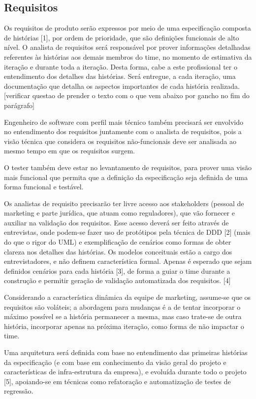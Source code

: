 \documentclass[12pt,journal,compsoc]{IEEEtran}
\begin{document}
\subsection{Requisitos}

Os requisitos de produto serão expressos por meio de uma especificação composta de histórias [1], por ordem de prioridade, que são definições funcionais de alto nível. O analista de requisitos será responsável por prover informações detalhadas referentes às histórias aos demais membros do time, no momento de estimativa da iteração e durante toda a iteração. Desta forma, cabe a este profissional ter o entendimento dos detalhes das histórias. Será entregue, a cada iteração, uma documentação que detalha os aspectos importantes de cada história realizada. [verificar questao de prender o texto com o que vem abaixo por gancho no fim do parágrafo]

Engenheiro de software com perfil mais técnico também precisará ser envolvido no entendimento dos requisitos juntamente com o analista de requisitos, pois a visão técnica que considera os requisitos não-funcionais deve ser analisada ao mesmo tempo em que os requisitos surgem.

O tester também deve estar no levantamento de requisitos, para prover uma visão mais funcional que permita que a definição da especificação seja definida de uma forma funcional e testável.

Os analistas de requisito precisarão ter livre acesso aos stakeholders (pessoal de marketing e parte jurídica, que atuam como reguladores), que vão fornecer e auxiliar na validação dos requisitos. Esse acesso deverá ser feito através de entrevistas, onde podem-se fazer uso de protótipos pela técnica de DDD [2] (mais do que o rigor do UML) e exemplificação de cenários como formas de obter clareza nos detalhes das histórias. Os modelos conceituais estão a cargo dos entrevistadores, e não definem característica formal. Apenas é esperado que sejam definidos cenários para cada história [3], de forma a guiar o time durante a construção e permitir geração de validação automatizada dos requisitos. [4]

Considerando a característica dinâmica da equipe de marketing, assume-se que os requisitos são voláteis; a abordagem para mudanças é a de tentar incorporar o máximo possível se a história permanecer a mesma, mas caso trate-se de outra história, incorporar apenas na próxima iteração, como forma de não impactar o time.

Uma arquitetura será definida com base no entendimento das primeiras histórias da especificação (e com base em conhecimento da visão geral do projeto e características de infra-estrutura da empresa), e evoluída durante todo o projeto [5], apoiando-se em técnicas como refatoração e automatização de testes de regressão.
\end{document}
